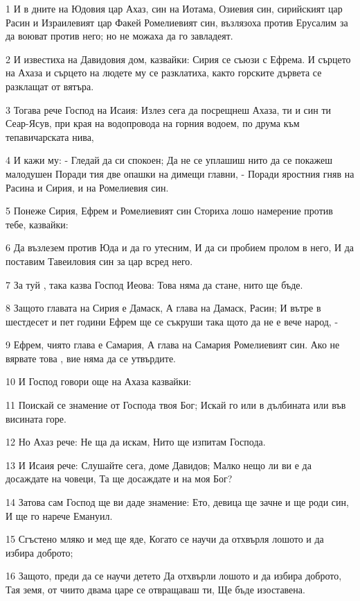 \par 1 И в дните на Юдовия цар Ахаз, син на Иотама, Озиевия син, сирийският цар Расин и Израилевият цар Факей Ромелиевият син, възлязоха против Ерусалим за да воюват против него; но не можаха да го завладеят.
\par 2 И известиха на Давидовия дом, казвайки: Сирия се съюзи с Ефрема. И сърцето на Ахаза и сърцето на людете му се разклатиха, както горските дървета се разклащат от вятъра.
\par 3 Тогава рече Господ на Исаия: Излез сега да посрещнеш Ахаза, ти и син ти Сеар-Ясув, при края на водопровода на горния водоем, по друма към тепавичарската нива,
\par 4 И кажи му: - Гледай да си спокоен; Да не се уплашиш нито да се покажеш малодушен Поради тия две опашки на димещи главни, - Поради яростния гняв на Расина и Сирия, и на Ромелиевия син.
\par 5 Понеже Сирия, Ефрем и Ромелиевият син Сториха лошо намерение против тебе, казвайки:
\par 6 Да възлезем против Юда и да го утесним, И да си пробием пролом в него, И да поставим Тавеиловия син за цар всред него.
\par 7 За туй , така казва Господ Иеова: Това няма да стане, нито ще бъде.
\par 8 Защото главата на Сирия е Дамаск, А глава на Дамаск, Расин; И вътре в шестдесет и пет години Ефрем ще се съкруши така щото да не е вече народ, -
\par 9 Ефрем, чиято глава е Самария, А глава на Самария Ромелиевият син. Ако не вярвате това , вие няма да се утвърдите.
\par 10 И Господ говори още на Ахаза казвайки:
\par 11 Поискай се знамение от Господа твоя Бог; Искай го или в дълбината или във висината горе.
\par 12 Но Ахаз рече: Не ща да искам, Нито ще изпитам Господа.
\par 13 И Исаия рече: Слушайте сега, доме Давидов; Малко нещо ли ви е да досаждате на човеци, Та ще досаждате и на моя Бог?
\par 14 Затова сам Господ ще ви даде знамение: Ето, девица ще зачне и ще роди син, И ще го нарече Емануил.
\par 15 Сгъстено мляко и мед ще яде, Когато се научи да отхвърля лошото и да избира доброто;
\par 16 Защото, преди да се научи детето Да отхвърли лошото и да избира доброто, Тая земя, от чиито двама царе се отвращаваш ти, Ще бъде изоставена.
